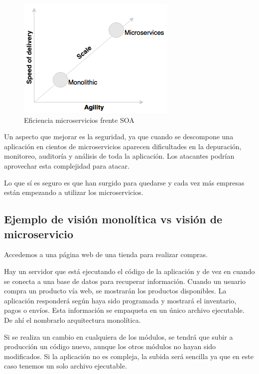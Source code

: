 \documentclass[12pt]{report} %
\begin{document}
\begin{figure}
	\centering
	\includegraphics[width=0.7\linewidth]{imagenes/desarrolloMonovsMicro}
	\caption{Eficiencia microservicios frente SOA}
	\label{fig:desarrollomonovsmicro}
\end{figure}

Un aspecto que mejorar es la seguridad, ya que cuando se descompone una aplicación en cientos de microservicios aparecen dificultades en la depuración, monitoreo, auditoría y análisis de toda la aplicación. Los atacantes podrían aprovechar esta complejidad para atacar. 

Lo que sí es seguro es que han surgido para quedarse y cada vez más empresas están empezando a utilizar los microservicios.

\subsection{Ejemplo de visión monolítica vs visión de microservicio}

Accedemos a una página web de una tienda para realizar compras.

Hay un servidor que está ejecutando el código de la aplicación y de vez en cuando se conecta a una base de datos para recuperar información.
Cuando un usuario compra un producto vía web, se mostrarán los productos disponibles. La aplicación responderá según haya sido programada y mostrará el inventario, pagos o envíos. Esta información se empaqueta en un único archivo ejecutable. De ahí el nombrarlo arquitectura monolítica.

Si se realiza un cambio en cualquiera de los módulos, se tendrá que subir a producción un código nuevo, aunque los otros módulos no hayan sido modificados. Si la aplicación no es compleja, la subida será sencilla ya que en este caso tenemos un solo archivo ejecutable.
\end{document}
